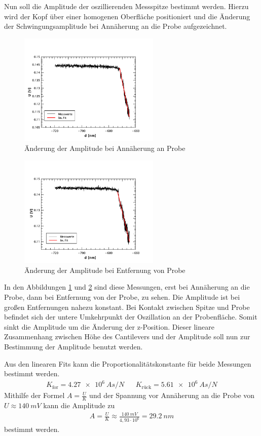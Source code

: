 Nun soll die Amplitude der oszillierenden Messspitze bestimmt werden. Hierzu wird
der Kopf über einer homogenen Oberfläche positioniert und die Änderung der 
Schwingungsamplitude bei Annäherung an die Probe aufgezeichnet.
\begin{figure}[hp]
    \centering
    \includegraphics[width=0.6\textwidth]{Mess/spek_forw.pdf}
    \caption{Änderung der Amplitude bei Annäherung an Probe}
    \label{spek_forw}
\end{figure}
\begin{figure}[hp]
    \centering
    \includegraphics[width=0.6\textwidth]{Mess/spek_backw.pdf}
    \caption{Änderung der Amplitude bei Entfernung von Probe}
    \label{spek_backw}
\end{figure}
In den Abbildungen \ref{spek_forw} und \ref{spek_backw} sind diese Messungen, erst
bei Annäherung an die Probe, dann bei Entfernung von der Probe, zu sehen. Die 
Amplitude ist bei großen Entfernungen nahezu konstant. Bei Kontakt zwischen Spitze
und Probe befindet sich der untere Umkehrpunkt der Oszillation an der Probenfläche.
Somit sinkt die Amplitude um die Änderung der z-Position. Dieser lineare 
Zusammenhang zwischen Höhe des Cantilevers und der Amplitude soll nun zur 
Bestimmung der Amplitude benutzt werden.\par
Aus den linearen Fits kann die Proportionalitätskonstante für beide Messungen
bestimmt werden.
\begin{align*}
    K_{\text{for}} = \SI{4,27e6}{A s \per N} & & K_{\text{rück}} = 
    \SI{5,61e6}{A s \per N}
\end{align*}
Mithilfe der Formel $\displaystyle A = \frac{U}{K}$ und der Spannung vor Annäherung
an die Probe von $U \approx \SI{140}{mV}$ kann die Amplitude zu
\begin{align*}
    A = \frac{U}{K} \approx \frac{\SI{140}{mV}}{4,93 \cdot 10^6} = \SI{29,2}{nm}
\end{align*}
bestimmt werden.

